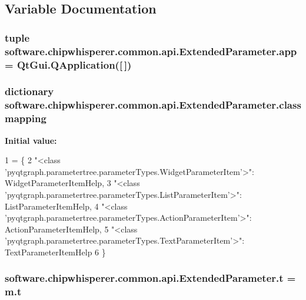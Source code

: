 \subsection{Variable Documentation}
\hypertarget{namespacesoftware_1_1chipwhisperer_1_1common_1_1api_1_1ExtendedParameter_a664d237b580080d9f0bd29bb2fcbc0de}{}
\subsubsection[{app}]{\setlength{\rightskip}{0pt plus 5cm}tuple software.\+chipwhisperer.\+common.\+api.\+Extended\+Parameter.\+app = Qt\+Gui.\+Q\+Application(\mbox{[}$\,$\mbox{]})}\label{namespacesoftware_1_1chipwhisperer_1_1common_1_1api_1_1ExtendedParameter_a664d237b580080d9f0bd29bb2fcbc0de}
\hypertarget{namespacesoftware_1_1chipwhisperer_1_1common_1_1api_1_1ExtendedParameter_a5c71b47251831d072cda35010f85d807}{}
\subsubsection[{classmapping}]{\setlength{\rightskip}{0pt plus 5cm}dictionary software.\+chipwhisperer.\+common.\+api.\+Extended\+Parameter.\+classmapping}\label{namespacesoftware_1_1chipwhisperer_1_1common_1_1api_1_1ExtendedParameter_a5c71b47251831d072cda35010f85d807}
{\bfseries Initial value\+:}
\begin{DoxyCode}
1 = \{
2     \textcolor{stringliteral}{"<class 'pyqtgraph.parametertree.parameterTypes.WidgetParameterItem'>"}: WidgetParameterItemHelp,
3     \textcolor{stringliteral}{"<class 'pyqtgraph.parametertree.parameterTypes.ListParameterItem'>"}: ListParameterItemHelp,
4     \textcolor{stringliteral}{"<class 'pyqtgraph.parametertree.parameterTypes.ActionParameterItem'>"}: ActionParameterItemHelp,
5     \textcolor{stringliteral}{"<class 'pyqtgraph.parametertree.parameterTypes.TextParameterItem'>"}: TextParameterItemHelp
6 \}
\end{DoxyCode}
\hypertarget{namespacesoftware_1_1chipwhisperer_1_1common_1_1api_1_1ExtendedParameter_a2d7c51a90eae1d0bf747cbfeab9e553e}{}
\subsubsection[{t}]{\setlength{\rightskip}{0pt plus 5cm}software.\+chipwhisperer.\+common.\+api.\+Extended\+Parameter.\+t = m.\+t}\label{namespacesoftware_1_1chipwhisperer_1_1common_1_1api_1_1ExtendedParameter_a2d7c51a90eae1d0bf747cbfeab9e553e}
